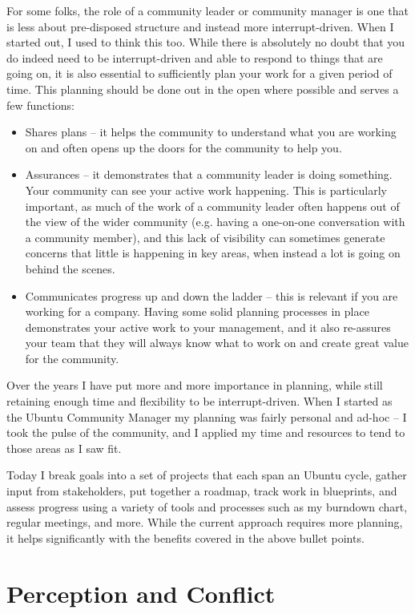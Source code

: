 For some folks, the role of a community leader or community manager is one that is less about pre-disposed structure and instead more interrupt-driven. When I started out, I used to think this too. While there is absolutely no doubt that you do indeed need to be interrupt-driven and able to respond to things that are going on, it is also essential to sufficiently plan your work for a given period of time.
This planning should be done out in the open where possible and serves a few functions:
\begin{itemize}
 \item Shares plans -- it helps the community to understand what you are working on and often opens up the doors for the community to help you.
 \item Assurances -- it demonstrates that a community leader is doing something. Your community can see your active work happening. This is particularly important, as much of the work of a community leader often happens out of the view of the wider community (e.g. having a one-on-one conversation with a community member), and this lack of visibility can sometimes generate concerns that little is happening in key areas, when instead a lot is going on behind the scenes.
 \item Communicates progress up and down the ladder -- this is relevant if you are working for a company. Having some solid planning processes in place demonstrates your active work to your management, and it also re-assures your team that they will always know what to work on and create great value for the community.
\end{itemize}
Over the years I have put more and more importance in planning, while still retaining enough time and flexibility to be interrupt-driven. When I started as the Ubuntu Community Manager my planning was fairly personal and ad-hoc -- I took the pulse of the community, and I applied my time and resources to tend to those areas as I saw fit.

Today I break goals into a set of projects that each span an Ubuntu cycle, gather input from stakeholders, put together a roadmap, track work in blueprints, and assess progress using a variety of tools and processes such as my burndown chart, regular meetings, and more. While the current approach requires more planning, it helps significantly with the benefits covered in the above bullet points.

\section*{Perception and Conflict}

